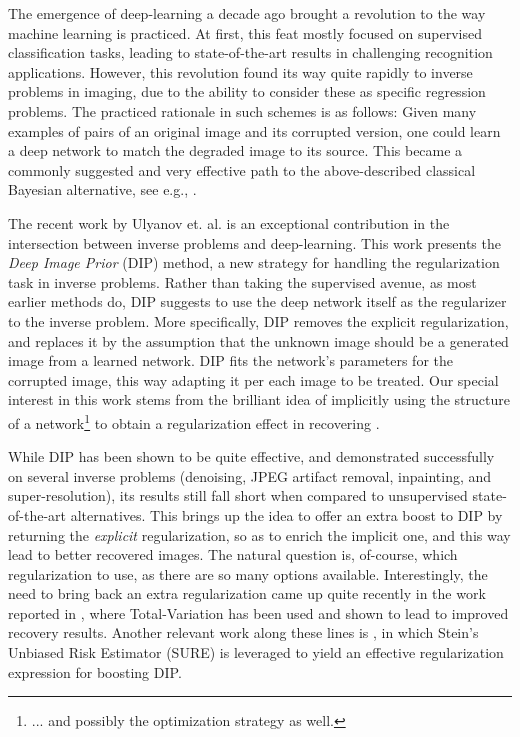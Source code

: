 \documentclass[12pt]{article}
\begin{document}
The emergence of deep-learning a decade ago brought a revolution to the way machine learning is practiced. At first, this feat mostly focused on supervised classification tasks, leading to state-of-the-art results in challenging recognition applications. However, this revolution found its way quite rapidly to inverse problems in imaging, due to the ability to consider these as specific regression problems. The practiced rationale in such schemes is as follows: Given many examples of pairs of an original image and its corrupted version, one could learn a deep network to match the degraded image to its source. This became a commonly suggested and very effective path to the above-described classical Bayesian alternative, see e.g., \cite{DL1, DL2, DL3, DL4, DL5, DL6, DL7, DL8, DL9, IRCNN, DL11, DL12}. 

The recent work by Ulyanov et. al. \cite{DIP-2018,DIP-Journal-2018} is an exceptional contribution in the intersection between inverse problems and deep-learning. This work presents the \emph{Deep Image Prior} (DIP) method, a new strategy for handling the regularization task in inverse problems. Rather than taking the supervised avenue, as most earlier methods do, DIP suggests to use the deep network itself as the regularizer to the inverse problem. More specifically, DIP removes the explicit regularization, and replaces it by the assumption that the unknown image  should be a generated image from a learned network. DIP fits the network's parameters for the corrupted image, this way adapting it per each image to be treated. Our special interest in this work stems from the brilliant idea of implicitly using the structure of a network\footnote{... and possibly the optimization strategy as well.}  to obtain a regularization effect in recovering . 

While DIP has been shown to be quite effective, and demonstrated successfully on several inverse problems (denoising, JPEG artifact removal, inpainting,  and super-resolution), its results still fall short when compared to unsupervised state-of-the-art alternatives. This brings up the idea to offer an extra boost to DIP by returning the \emph{explicit} regularization, so as to enrich the implicit one, and this way lead to better recovered images. The natural question is, of-course, which regularization to use, as there are so many options available. Interestingly, the need to bring back an extra regularization came up quite recently in the work reported in \cite{DIP-TV}, where Total-Variation \cite{rudin1992nonlinear} has been used and shown to lead to improved recovery results. Another relevant work along these lines is \cite{metzler2018unsupervised}, in which Stein's Unbiased Risk Estimator (SURE) is leveraged to yield an effective regularization expression for boosting DIP. 
\end{document}
